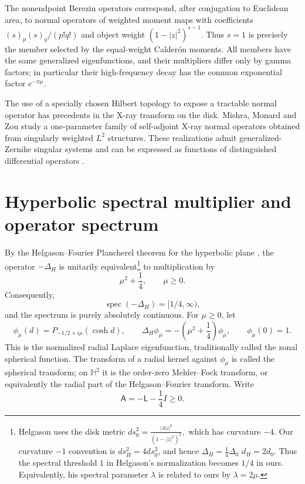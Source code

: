 \IfFileExists{iopjournal.cls}{\documentclass{iopjournal}}{\documentclass{iopjournal-draft}}
\theoremstyle{definition}
\theoremstyle{remark}
\newcommand{\dd}{\,\mathrm d}
\numberwithin{equation}{section}
\begin{document}
The nonendpoint Berezin operators correspond, after conjugation to Euclidean area, to normal operators of weighted moment maps with coefficients \((s)_p(s)_q/(p!q!)\) and object weight \((1-|z|^2)^{s-1}\). Thus \(s=1\) is precisely the member selected by the equal-weight Calderón moments. All members have the same generalized eigenfunctions, and their multipliers differ only by gamma factors; in particular their high-frequency decay has the common exponential factor \(e^{-\pi\mu}\).

The use of a specially chosen Hilbert topology to expose a tractable
normal operator has precedents in the X-ray transform on the disk.  Mishra,
Monard and Zou study a one-parameter family of self-adjoint X-ray
normal operators obtained from singularly weighted $L^2$ structures.
These realizations admit generalized-Zernike singular systems and can
be expressed as functions of distinguished differential operators
\cite{MishraMonardZou2023}. 


\section{Hyperbolic spectral multiplier and operator spectrum}
\label{sec:spectrum}
By the Helgason--Fourier Plancherel theorem for the hyperbolic plane
\cite[Introduction, \S4]{Helgason1984}, the operator $-\Delta_H$ is
unitarily equivalent\footnote{Helgason uses the disk metric
	$
	ds_0^2=\frac{|\dd z|^2}{(1-|z|^2)^2},
	$
	which has curvature $-4$.  Our curvature $-1$ convention is
	$ds_H^2=4ds_0^2$, and hence
	$
	\Delta_H=\frac14\Delta_0$
	$d_H=2d_0.
	$
	Thus the spectral threshold $1$ in Helgason's normalization becomes
	$1/4$ in ours.  Equivalently, his spectral parameter $\lambda$ is
	related to ours by $\lambda=2\mu$.} to multiplication by
\[
\mu^2+\frac14,\qquad \mu\geq0.
\]
Consequently,
\[
\operatorname{spec}(-\Delta_H)=[1/4,\infty),
\]
and the spectrum is purely absolutely continuous.  For $\mu\geq0$, let
\[
\phi_\mu(d)
=
P_{-1/2+i\mu}(\cosh d),
\qquad
\Delta_H\phi_\mu
=
-\left(\mu^2+\frac14\right)\phi_\mu,
\qquad
\phi_\mu(0)=1.
\]
This is the normalized radial Laplace eigenfunction, traditionally
called the zonal spherical function.  The transform of a radial
kernel against $\phi_\mu$ is called the spherical transform; on
$\mathbb H^2$ it is the order-zero Mehler--Fock transform, or
equivalently the radial part of the Helgason--Fourier transform.
 Write
\begin{equation}
 \mathsf A=-\mathsf L-\frac14I\geq0.
 \label{eq:A}
\end{equation}
\end{document}
